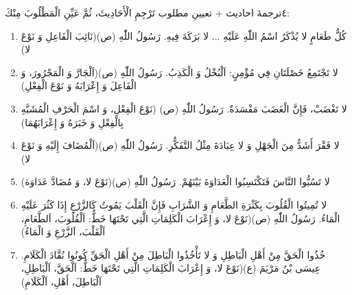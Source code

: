 \begin{JTamrin}{٤}{ترجمهٔ احادیث + تعیینِ مطلوب}
تَرْجِمِ الْأَحَادِيثَ، ثُمَّ عَيِّنِ الْمَطْلُوبَ مِنْكَ:

\begin{enumerate}
  \item كُلُّ طَعَامٍ لا يُذْكَرُ اسْمُ اللّٰهِ عَلَيْهِ ... لا بَرَكَةَ فِيهِ.
        رَسُولُ اللّٰهِ (ص)\hfill (نَائِبَ الْفَاعِلِ وَ نَوْعَ لا)
  \item لا تَجْتَمِعُ خَصْلَتَانِ فِي مُؤْمِنٍ: اَلْبُخْلُ وَ الْكَذِبُ.
        رَسُولُ اللّٰهِ (ص)\hfill (اَلْجَارَّ وَ الْمَجْرُورَ، وَ الْفَاعِلَ
        وَ إِعْرَابَهُ وَ نَوْعَ الْفِعْلِ)
  \item لا تَغْضَبْ، فَإِنَّ الْغَضَبَ مَفْسَدَةٌ. رَسُولُ اللّٰهِ (ص)
        \hfill (نَوْعَ الْفِعْلِ، وَ اسْمَ الْحَرْفِ الْمُشَبَّهِ بِالْفِعْلِ
        وَ خَبَرَهُ وَ إِعْرَابَهُمَا) 
  \item لا فَقْرَ أَشَدُّ مِنَ الْجَهْلِ وَ لا عِبَادَةَ مِثْلُ التَّفَكُّرِ.
        رَسُولُ اللّٰهِ (ص)\hfill (اَلْمُضَافَ إِلَيْهِ وَ نَوْعَ لا)
  \item لا تَسُبُّوا النَّاسَ فَتَكْتَسِبُوا الْعَدَاوَةَ بَيْنَهُمْ.
        رَسُولُ اللّٰهِ (ص)\hfill (نَوْعَ لا، وَ مُضَادَّ عَدَاوَة)
  \item لا تُمِيتُوا الْقُلُوبَ بِكَثْرَةِ الطَّعَامِ وَ الشَّرَابِ
        فَإِنَّ الْقَلْبَ يَمُوتُ كَالزَّرْعِ إِذَا كَثُرَ عَلَيْهِ الْمَاءُ.
        رَسُولُ اللّٰهِ (ص)\hfill (نَوْعَ لا، وَ إِعْرَابَ الْكَلِمَاتِ
        الَّتِي تَحْتَهَا خَطٌّ: اَلْقُلُوبَ، اَلطَّعَامِ، اَلْقَلْبَ،
        اَلزَّرْعِ وَ الْمَاءُ) 
  \item خُذُوا الْحَقَّ مِنْ أَهْلِ الْبَاطِلِ وَ لا تَأْخُذُوا
        الْبَاطِلَ مِنْ أَهْلِ الْحَقِّ كُونُوا نُقَّادَ الْكَلَامِ.
        عِيسَى بْنُ مَرْيَمَ (ع)\hfill (نَوْعَ لا، وَ إِعْرَابَ الْكَلِمَاتِ
        الَّتِي تَحْتَهَا خَطٌّ: اَلْحَقَّ، اَلْبَاطِلِ، اَلْبَاطِلَ، أَهْلِ،
        اَلْكَلَامِ) 
\end{enumerate}
\end{JTamrin}

